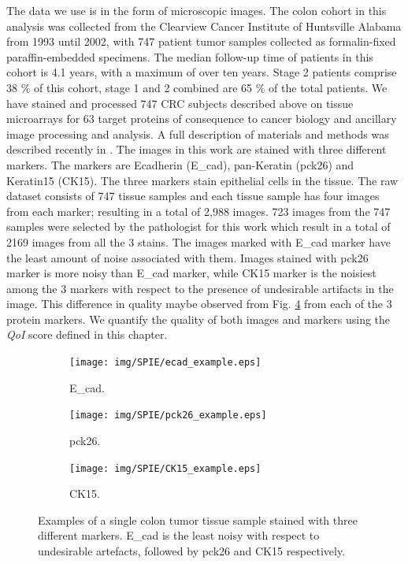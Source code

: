 The data we use is in the form of microscopic images. The colon cohort in this analysis was collected from the Clearview Cancer Institute of Huntsville Alabama from 1993 until 2002, with 747 patient tumor samples collected as formalin-fixed paraffin-embedded specimens. The median follow-up time of patients in this cohort is 4.1 years, with a maximum of over ten years. Stage 2 patients comprise 38 \% of this cohort, stage 1 and 2 combined are 65 \% of the total patients. We have stained and processed 747 CRC subjects described above on tissue microarrays for 63 target proteins of consequence to cancer biology and ancillary image processing and analysis. A full description of materials and methods was described recently in \cite{gerdes2013highly}.
The images in this work are stained with three different markers. The markers are Ecadherin (E\_cad), pan-Keratin (pck26) and Keratin15 (CK15). The three markers stain epithelial cells in the tissue. The raw dataset consists of 747 tissue samples and each tissue sample has four images from each marker; resulting in a total of 2,988 images.  723 images from the 747 samples were selected by the pathologist for this work which result in a total of 2169 images from all the 3 stains.
The images marked with E\_cad marker have the least amount of noise associated with them. Images stained with pck26 marker is more noisy than E\_cad marker, while CK15 marker is the noisiest among the 3 markers with respect to the presence of undesirable artifacts in the image. This difference in quality maybe observed from Fig. \ref{fig:example_images} from each of the 3 protein markers. We quantify the quality of  both images and markers using the \textit{QoI} score defined in this chapter. 

\begin{figure}
    \centering
    \begin{subfigure}[b]{0.3\textwidth}
        \centering
        \texttt{[image: img/SPIE/ecad\_example.eps]}
        \caption{E\_cad.}
        \label{fig:ecad_example}
    \end{subfigure}
    \hfill
    \begin{subfigure}[b]{0.3\textwidth}
        \centering
        \texttt{[image: img/SPIE/pck26\_example.eps]}
        \caption{pck26.}
        \label{fig:pck26_example}
    \end{subfigure}
    \hfill
    \begin{subfigure}[b]{0.3\textwidth}
        \centering
        \texttt{[image: img/SPIE/CK15\_example.eps]}
        \caption{CK15.}
        \label{fig:CK15_example}
    \end{subfigure}
    \caption{Examples of a single colon tumor tissue sample stained with three different markers. E\_cad is the least noisy with respect to undesirable artefacts, followed by pck26 and CK15 respectively.}
    \label{fig:example_images}
\end{figure}

